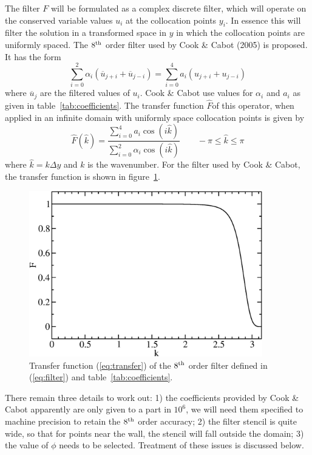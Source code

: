 \documentclass[11pt]{article}%
\begin{document}
The filter $F$ will be formulated as a complex discrete filter, which
will operate on the conserved variable values $u_i$ at the collocation
points $y_i$. In essence this will filter the solution in a transformed
space in $y$ in which the collocation points are uniformly spaced. The
$8^{\rm th}$ order filter used by Cook \& Cabot (2005) is proposed. It
has the form
\begin{equation}
\sum_{i=0}^2 \alpha_i(\overline u_{j+i} + \overline u_{j-i}) = \sum_{i=0}^4
 a_i(u_{j+i}+u_{j-i})
\label{eq:filter}
\end{equation}
where $\overline u_j$ are the filtered values of $u_i$. Cook \& Cabot use
values for $\alpha_i$ and $a_i$ as given in table~\ref{tab:coefficients}. The transfer
function $\hat F$of this operator, when applied in an infinite domain with
uniformly space collocation points is given by
\begin{equation}
\hat F(\hat k)=\frac{\sum_{i=0}^4a_i\cos(i\hat
 k)}{\sum_{i=0}^2\alpha_i\cos(i\hat k)}\qquad -\pi\leq\hat k\leq\pi
\label{eq:transfer}
\end{equation}
where $\hat k=k\Delta y$ and $k$ is the wavenumber. For the filter used
by Cook \& Cabot, the transfer function is shown in figure~\ref{fig:transfer}.

\begin{figure}[t]
\begin{center}
\includegraphics[width=4in]{transfer_function}
\end{center}
 \caption{Transfer function (\ref{eq:transfer}) of the $8^{\rm th}$ order filter defined in
 (\ref{eq:filter}) and table~\ref{tab:coefficients}.}
\label{fig:transfer}
\end{figure}

There remain three details to work out: 1) the coefficients provided by
Cook \& Cabot apparently are only given to a part in $10^6$, we will
need them specified to machine precision to retain the $8^{\rm th}$
order accuracy; 2) the filter stencil is quite wide, so that for points
near the wall, the stencil will fall outside the domain; 3) the value of
$\phi$ needs to be selected. Treatment of
these issues is discussed below.
\end{document}
